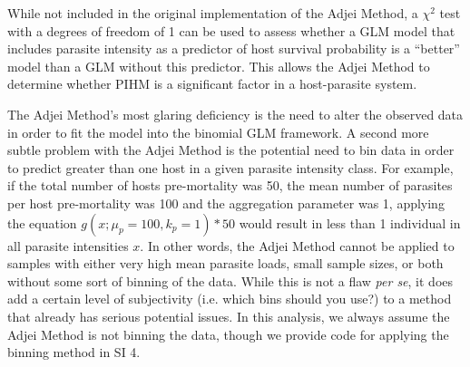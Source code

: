\documentclass[12pt, a4paper]{article}
\makeatletter
\renewcommand{\section}{\@startsection
{section}%
{1}%
{0mm}%
{-\baselineskip}%
{0.5\baselineskip}%
{\normalfont\bf\large}} %
\makeatother
\begin{document}
While not included in the original implementation of the Adjei Method, a
$\chi^2$ test with a degrees of freedom of 1 can be used to assess whether a GLM model that includes parasite
intensity as a predictor of host survival probability is a ``better'' model than a
GLM without this predictor.  This allows the Adjei Method to determine whether
PIHM is a significant factor in a host-parasite system.

The Adjei Method's most glaring deficiency is the need to alter the observed
data in order to fit the model into the binomial GLM framework.  A second more
subtle problem with the Adjei Method is the potential need to bin data in order
to predict greater than one host in a given parasite intensity class.  For
example, if the total number of hosts pre-mortality was 50, the mean number of
parasites per host pre-mortality was 100 and the aggregation parameter was 1, applying the equation $g(x ; \mu_p=100, k_p=1) * 50$ would result in
less than 1 individual in all parasite intensities $x$. In other words, the
Adjei Method cannot be applied to samples with either very high mean parasite
loads, small sample sizes, or both without some sort of binning of the data.
While this is not a flaw \emph{per se}, it does add a certain level of
subjectivity (i.e. which bins should you use?) to a method that already has
serious potential issues.  In this analysis, we always assume the Adjei Method is not binning the data, though we provide code for applying the binning method in SI 4.





\end{document}
